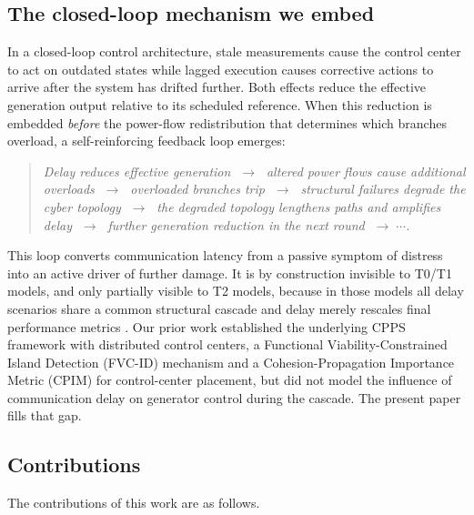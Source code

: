 \subsection*{The closed-loop mechanism we embed}

In a closed-loop control architecture, stale measurements cause the
control center to act on outdated states while lagged execution causes
corrective actions to arrive after the system has drifted further.  Both
effects reduce the effective generation output relative to its scheduled
reference.  When this reduction is embedded \emph{before} the power-flow
redistribution that determines which branches overload, a
self-reinforcing feedback loop emerges:
\begin{quote}
\emph{Delay reduces effective generation
$\;\to\;$ altered power flows cause additional overloads
$\;\to\;$ overloaded branches trip
$\;\to\;$ structural failures degrade the cyber topology
$\;\to\;$ the degraded topology lengthens paths and amplifies delay
$\;\to\;$ further generation reduction in the next round
$\;\to\;\cdots$.}
\end{quote}
This loop converts communication latency from a passive symptom of
distress into an active driver of further damage.  It is by
construction invisible to T0/T1 models, and only partially visible to
T2 models, because in those models all delay scenarios share a
common structural cascade and delay merely rescales final performance
metrics \citep{LaiCPPS2019}.  Our prior work
\citep{ChenTu2026} established the underlying CPPS framework with
distributed control centers, a Functional
Viability-Constrained Island Detection (FVC-ID) mechanism and a
Cohesion-Propagation Importance Metric (CPIM) for control-center
placement, but did not model the influence of communication delay on
generator control during the cascade.  The present paper fills that
gap.

\subsection*{Contributions}

The contributions of this work are as follows.

